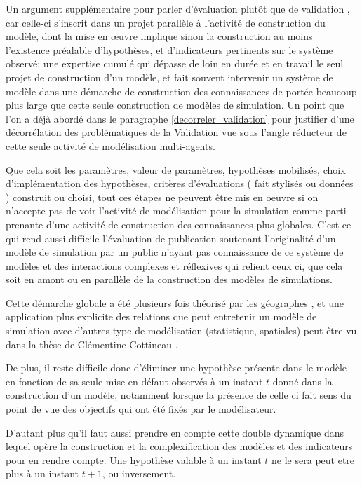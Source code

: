Un argument supplémentaire pour parler d'évaluation plutôt que de validation \autocite{Amblard2006}, car celle-ci s'inscrit dans un projet parallèle à l'activité de construction du modèle, dont la mise en œuvre implique sinon la construction au moins l'existence préalable d'hypothèses, et d'indicateurs pertinents sur le système observé; une expertise cumulé qui dépasse de loin en durée et en travail le seul projet de construction d'un modèle, et fait souvent intervenir un système de modèle dans une démarche de construction des connaissances de portée beaucoup plus large que cette seule construction de modèles de simulation. Un point que l'on a déjà abordé dans le paragraphe \ref{decorreler_validation} pour justifier d'une décorrélation des problématiques de la Validation vue sous l'angle réducteur de cette seule activité de modélisation multi-agents.


Que cela soit les paramètres, valeur de paramètres, hypothèses mobilisés, choix d'implémentation des hypothèses, critères d'évaluations ( fait stylisés ou données ) construit ou choisi, tout ces étapes ne peuvent être mis en oeuvre si on n'accepte pas de voir l'activité de modélisation pour la simulation comme parti prenante d'une activité de construction des connaissances plus globales. C'est ce qui rend aussi difficile l'évaluation de publication soutenant l'originalité d'un modèle de simulation par un public n'ayant pas connaissance de ce système de modèles et des interactions complexes et réflexives qui relient ceux ci, que cela soit en amont ou en parallèle de la construction des modèles de simulations.

Cette démarche globale a été plusieurs fois théorisé par les géographes \autocites{Besse2000, Sanders2000, Mathian2014}, et une application plus explicite des relations que peut entretenir un modèle de simulation avec d'autres type de modélisation (statistique, spatiales) peut être vu dans la thèse de Clémentine Cottineau \autocite{Cottineau2014a, Cottineau2014b}. 

De plus, il reste difficile donc d'éliminer une hypothèse présente dans le modèle en fonction de sa seule mise en défaut observés à un instant $t$ donné dans la construction d'un modèle, notamment lorsque la présence de celle ci fait sens du point de vue des objectifs qui ont été fixés par le modélisateur. 

D'autant plus qu'il faut aussi prendre en compte cette double dynamique dans lequel opère la construction et la complexification des modèles et des indicateurs pour en rendre compte. Une hypothèse valable à un instant $t$ ne le sera peut etre plus à un instant $t + 1$, ou inversement. 

